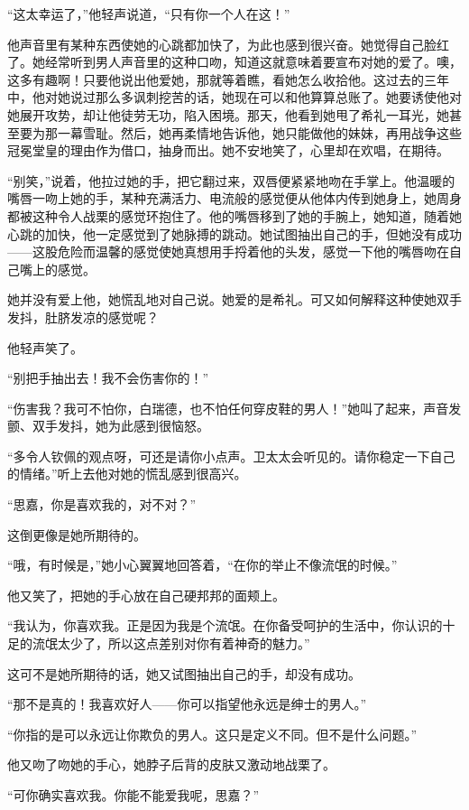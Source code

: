 \par “这太幸运了，”他轻声说道，“只有你一个人在这！”
\par 他声音里有某种东西使她的心跳都加快了，为此也感到很兴奋。她觉得自己脸红了。她经常听到男人声音里的这种口吻，知道这就意味着要宣布对她的爱了。噢，这多有趣啊！只要他说出他爱她，那就等着瞧，看她怎么收拾他。这过去的三年中，他对她说过那么多讽刺挖苦的话，她现在可以和他算算总账了。她要诱使他对她展开攻势，却让他徒劳无功，陷入困境。那天，他看到她甩了希礼一耳光，她甚至要为那一幕雪耻。然后，她再柔情地告诉他，她只能做他的妹妹，再用战争这些冠冕堂皇的理由作为借口，抽身而出。她不安地笑了，心里却在欢唱，在期待。
\par “别笑，”说着，他拉过她的手，把它翻过来，双唇便紧紧地吻在手掌上。他温暖的嘴唇一吻上她的手，某种充满活力、电流般的感觉便从他体内传到她身上，她周身都被这种令人战栗的感觉环抱住了。他的嘴唇移到了她的手腕上，她知道，随着她心跳的加快，他一定感觉到了她脉搏的跳动。她试图抽出自己的手，但她没有成功——这股危险而温馨的感觉使她真想用手捋着他的头发，感觉一下他的嘴唇吻在自己嘴上的感觉。
\par 她并没有爱上他，她慌乱地对自己说。她爱的是希礼。可又如何解释这种使她双手发抖，肚脐发凉的感觉呢？
\par 他轻声笑了。
\par “别把手抽出去！我不会伤害你的！”
\par “伤害我？我可不怕你，白瑞德，也不怕任何穿皮鞋的男人！”她叫了起来，声音发颤、双手发抖，她为此感到很恼怒。
\par “多令人钦佩的观点呀，可还是请你小点声。卫太太会听见的。请你稳定一下自己的情绪。”听上去他对她的慌乱感到很高兴。
\par “思嘉，你是喜欢我的，对不对？”
\par 这倒更像是她所期待的。
\par “哦，有时候是，”她小心翼翼地回答着，“在你的举止不像流氓的时候。”
\par 他又笑了，把她的手心放在自己硬邦邦的面颊上。
\par “我认为，你喜欢我。正是因为我是个流氓。在你备受呵护的生活中，你认识的十足的流氓太少了，所以这点差别对你有着神奇的魅力。”
\par 这可不是她所期待的话，她又试图抽出自己的手，却没有成功。
\par “那不是真的！我喜欢好人——你可以指望他永远是绅士的男人。”
\par “你指的是可以永远让你欺负的男人。这只是定义不同。但不是什么问题。”
\par 他又吻了吻她的手心，她脖子后背的皮肤又激动地战栗了。
\par “可你确实喜欢我。你能不能爱我呢，思嘉？”
